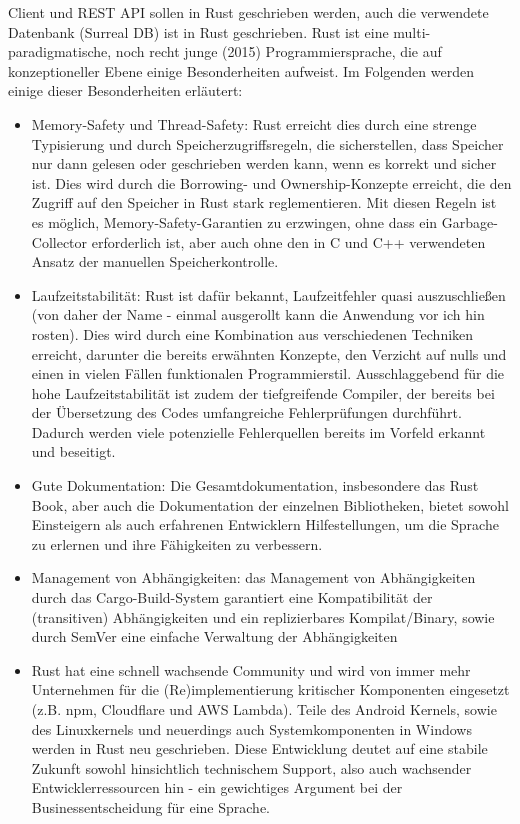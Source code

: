 \documentclass[notitlepage, hidelinks]{article}
\begin{document}
Client und REST API sollen in Rust geschrieben werden, auch die verwendete Datenbank (Surreal DB) ist in Rust geschrieben. Rust ist eine multi-paradigmatische, noch recht junge (2015) Programmiersprache, die auf konzeptioneller Ebene einige Besonderheiten aufweist. Im Folgenden werden einige dieser Besonderheiten erläutert:
\begin{itemize}
\item Memory-Safety und Thread-Safety: Rust erreicht dies durch eine strenge Typisierung und durch Speicherzugriffsregeln, die sicherstellen, dass Speicher nur dann gelesen oder geschrieben werden kann, wenn es korrekt und sicher ist. Dies wird durch die Borrowing- und Ownership-Konzepte erreicht, die den Zugriff auf den Speicher in Rust stark reglementieren. Mit diesen Regeln ist es möglich, Memory-Safety-Garantien zu erzwingen, ohne dass ein Garbage-Collector erforderlich ist, aber auch ohne den in C und C++ verwendeten Ansatz der manuellen Speicherkontrolle.
\item Laufzeitstabilität: Rust ist dafür bekannt, Laufzeitfehler quasi auszuschließen (von daher der Name - einmal ausgerollt kann die Anwendung vor ich hin rosten). Dies wird durch eine Kombination aus verschiedenen Techniken erreicht, darunter die bereits erwähnten Konzepte, den Verzicht auf nulls und einen in vielen Fällen funktionalen Programmierstil. Ausschlaggebend für die hohe Laufzeitstabilität ist zudem der tiefgreifende Compiler, der bereits bei der Übersetzung des Codes umfangreiche Fehlerprüfungen durchführt. Dadurch werden viele potenzielle Fehlerquellen bereits im Vorfeld erkannt und beseitigt.
\item Gute Dokumentation: Die Gesamtdokumentation, insbesondere das Rust Book, aber auch die Dokumentation der einzelnen Bibliotheken, bietet sowohl Einsteigern als auch erfahrenen Entwicklern Hilfestellungen, um die Sprache zu erlernen und ihre Fähigkeiten zu verbessern.
\item Management von Abhängigkeiten: das Management von Abhängigkeiten durch das Cargo-Build-System garantiert eine Kompatibilität der (transitiven) Abhängigkeiten und ein replizierbares Kompilat/Binary, sowie durch SemVer eine einfache Verwaltung der Abhängigkeiten
\item Rust hat eine schnell wachsende Community und wird von immer mehr Unternehmen für die (Re)implementierung kritischer Komponenten eingesetzt (z.B. npm, Cloudflare und AWS Lambda). Teile des Android Kernels, sowie des Linuxkernels und neuerdings auch Systemkomponenten in Windows werden in Rust neu geschrieben. Diese Entwicklung deutet auf eine stabile Zukunft sowohl hinsichtlich technischem Support, also auch wachsender Entwicklerressourcen hin - ein gewichtiges Argument bei der Businessentscheidung für eine Sprache.
\end{itemize}
\end{document}
